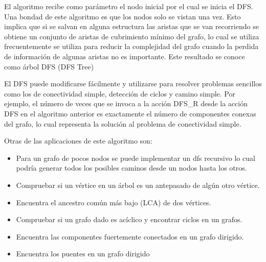 El algoritmo recibe como parámetro el nodo inicial por el cual se inicia el DFS. Una bondad de este algoritmo es que los nodos solo se vistan una vez. Esto implica que si se salvan en alguna estructura las aristas que se van recorriendo se obtiene un conjunto de aristas de cubrimiento mínimo del grafo, lo cual se utiliza frecuentemente se utiliza para reducir la complejidad del grafo cuando la perdida de información de algunas aristas no es importante. Este resultado se conoce como árbol DFS (DFS Tree)

El DFS puede modificarse fácilmente y utilizarse para resolver problemas sencillos como los de conectividad simple, detección de ciclos y camino simple. Por ejemplo, el número de veces que se invoca a la acción DFS\_R desde la acción DFS en el algoritmo anterior es exactamente el número de componentes conexas del grafo, lo cual representa la solución al problema de conectividad simple.

Otras de las aplicaciones de este algoritmo son:

\begin{itemize}
	\item Para un grafo de pocos nodos se puede implementar un dfs recursivo lo cual podría generar todos los posibles caminos desde un nodos hasta los otros.
	\item Compruebar si un vértice en un árbol es un antepasado de algún otro vértice.
	\item Encuentra el ancestro común más bajo (LCA) de dos vértices.
	\item Compruebar  si un grafo dado es acíclico y encontrar ciclos en un grafos.
	\item Encuentra las  componentes fuertemente conectados en un grafo dirigido.
	\item Encuentra los puentes en un grafo dirigido
\end{itemize}
